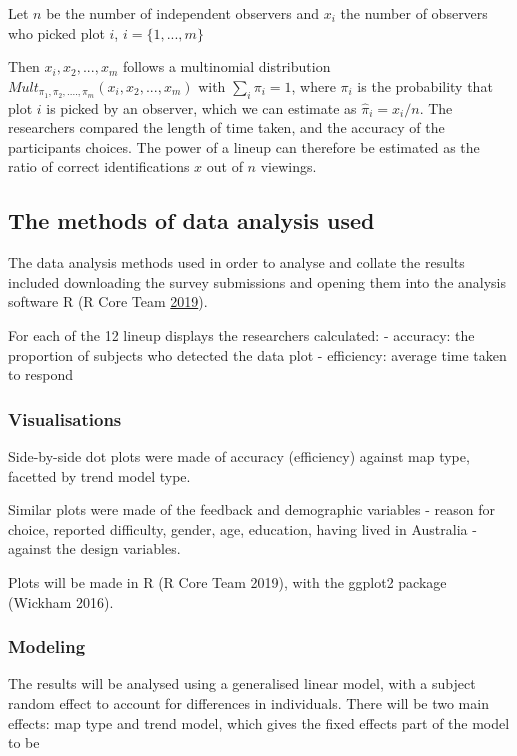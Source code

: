 \documentclass[conference,final,]{IEEEtran}
\begin{document}
Let \(n\) be the number of independent observers and \(x_i\) the number
of observers who picked plot \(i\), \(i = \{1,...,m\}\)

Then \(x_i, x_2, ..., x_m\) follows a multinomial
distribution\(Mult_{\pi_1, \pi_2, ...., \pi_m}(x_i, x_2, ..., x_m)\)
with \(\sum_i \pi_i = 1\), where \(\pi_i\) is the probability that plot
\(i\) is picked by an observer, which we can estimate as
\(\hat{\pi}_i = x_i/n\). The researchers compared the length of time
taken, and the accuracy of the participants choices. The power of a
lineup can therefore be estimated as the ratio of correct
identifications \(x\) out of \(n\) viewings.

\hypertarget{the-methods-of-data-analysis-used}{%
\subsection{The methods of data analysis
used}\label{the-methods-of-data-analysis-used}}

The data analysis methods used in order to analyse and collate the
results included downloading the survey submissions and opening them
into the analysis software R (R Core Team
\protect\hyperlink{ref-RCore}{2019}).

For each of the 12 lineup displays the researchers calculated: -
accuracy: the proportion of subjects who detected the data plot -
efficiency: average time taken to respond

\hypertarget{visualisations}{%
\subsubsection{Visualisations}\label{visualisations}}

Side-by-side dot plots were made of accuracy (efficiency) against map
type, facetted by trend model type.

Similar plots were made of the feedback and demographic variables -
reason for choice, reported difficulty, gender, age, education, having
lived in Australia - against the design variables.

Plots will be made in R (R Core Team 2019), with the ggplot2 package
(Wickham 2016).

\hypertarget{modeling}{%
\subsubsection{Modeling}\label{modeling}}

The results will be analysed using a generalised linear model, with a
subject random effect to account for differences in individuals. There
will be two main effects: map type and trend model, which gives the
fixed effects part of the model to be
\end{document}
